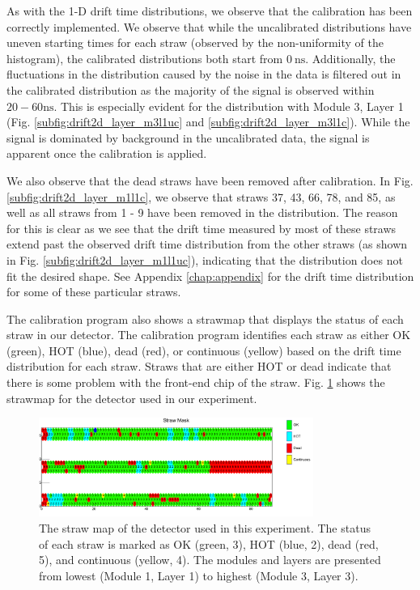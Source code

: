 \documentclass[a4paper]{report}
\numberwithin{equation}{section}
\begin{document}
As with the 1-D drift time distributions, we observe that the calibration has been correctly implemented. We observe that while the 
uncalibrated distributions have uneven starting times for each straw (observed by the non-uniformity of the histogram), the calibrated 
distributions both start from $\SI{0}{\nano\second}$. Additionally, the fluctuations in the distribution caused by the noise
in the data is filtered out in the calibrated distribution as the majority of the signal is observed within $20 - 60 \si{\nano\second}$. 
This is especially evident for the distribution with Module 3, Layer 1 (Fig. \ref{subfig:drift2d_layer_m3l1uc} and \ref{subfig:drift2d_layer_m3l1c}). 
While the signal is dominated by background in the uncalibrated data, the signal is apparent once the calibration is applied. \par 

We also observe that the dead straws have been removed after calibration. In Fig. \ref{subfig:drift2d_layer_m1l1c}, we observe that 
straws 37, 43, 66, 78, and 85, as well as all straws from 1 - 9 have been removed in the distribution. The reason for this is clear as we see that 
the drift time measured by most of these straws extend past the observed drift time distribution from the other straws (as shown in Fig. 
\ref{subfig:drift2d_layer_m1l1uc}), indicating that the distribution does not fit the desired shape. See Appendix \ref{chap:appendix} for the drift time 
distribution for some of these particular straws. \par 

The calibration program also shows a strawmap that displays the status of each straw in our detector. The calibration program 
identifies each straw as either OK (green), HOT (blue), dead (red), or continuous (yellow) based on the drift time distribution 
for each straw. Straws that are either HOT or dead indicate that there is some problem with the front-end chip of the straw.
Fig. \ref{fig:calib_strawmap} shows the strawmap for the detector used in our experiment. 

\begin{figure}[!h]
	\centering
	\includegraphics[width=0.8\textwidth]{calib_strawmask.png}
	\caption{The straw map of the detector used in this experiment. The status of each straw is marked as OK (green, 3), 
	HOT (blue, 2), dead (red, 5), and continuous (yellow, 4). The modules and layers are presented from lowest 
	(Module 1, Layer 1) to highest (Module 3, Layer 3).}
	\label{fig:calib_strawmap}
\end{figure}
\end{document}
